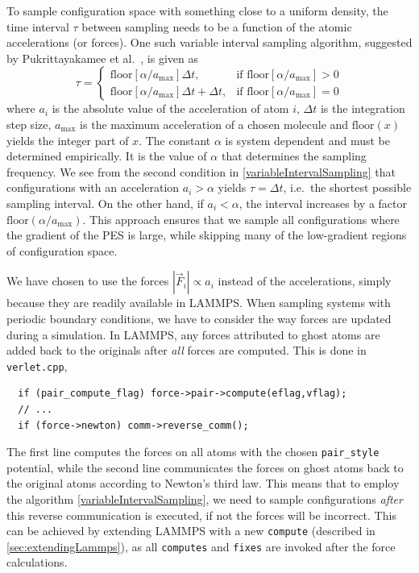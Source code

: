 \documentclass[twoside,english]{uiofysmaster}
\begin{document}
To sample configuration space with something close to a uniform density, the time interval $\tau$ between 
sampling needs to be a function of the atomic accelerations (or forces). One such variable 
interval sampling algorithm, suggested by Pukrittayakamee et al.\ \cite{Pukrittayakamee09}, is given as
\begin{equation}
 \tau = 
\begin{cases}
\textrm{floor}\left[\alpha/a_{\textrm{max}}\right]\Delta t, 
&\textrm{if floor}\left[\alpha/a_{\textrm{max}}\right] > 0 \\
\textrm{floor}\left[\alpha/a_{\textrm{max}}\right]\Delta t + \Delta t, 
&\textrm{if floor}\left[\alpha/a_{\textrm{max}}\right] = 0
\end{cases}
\label{variableIntervalSampling}
\end{equation}
where $a_i$ is the absolute value of the acceleration of atom $i$, $\Delta t$ is the integration step size, 
$a_\textrm{max}$ is the maximum acceleration of a chosen molecule and $\textrm{floor}(x)$ yields
the integer part of $x$. The constant $\alpha$ is system dependent and must be determined empirically. It is the value 
of $\alpha$ that determines the sampling frequency. We see from the second condition in \eqref{variableIntervalSampling} that
configurations with an acceleration $a_i > \alpha$ yields $\tau = \Delta t$, i.e.\ the shortest possible sampling
interval. On the other hand, if $a_i < \alpha$, the interval increases by a factor $\textrm{floor}(\alpha/a_\textrm{max})$. 
This approach ensures that we sample all configurations where the gradient of the PES is large, while skipping many
of the low-gradient regions of configuration space. 

We have chosen to use the forces $|\vec{F}_i| \propto a_i$ instead of the accelerations, simply because they are
readily available in LAMMPS. When sampling systems with periodic boundary conditions, we have to consider 
the way forces are updated during a simulation. In LAMMPS, any forces attributed to ghost atoms are added back 
to the originals after \textit{all} forces are computed. This is done in
\texttt{verlet.cpp},
\begin{listing}[H]
 \begin{verbatim}
  if (pair_compute_flag) force->pair->compute(eflag,vflag);
  // ...
  if (force->newton) comm->reverse_comm();
 \end{verbatim}
\end{listing}
The first line computes the forces on all atoms with the chosen \texttt{pair\_style} potential, while
the second line communicates the forces on ghost atoms back to the original atoms according to Newton's third law. 
This means that to employ the algorithm
\eqref{variableIntervalSampling}, we need to sample configurations \textit{after} this reverse communication is
executed, if not the forces will be incorrect. This can be achieved by extending LAMMPS with a new \texttt{compute} 
(described in \autoref{sec:extendingLammps}), as all \texttt{computes} and \texttt{fixes} are invoked after the
force calculations. 
\end{document}
